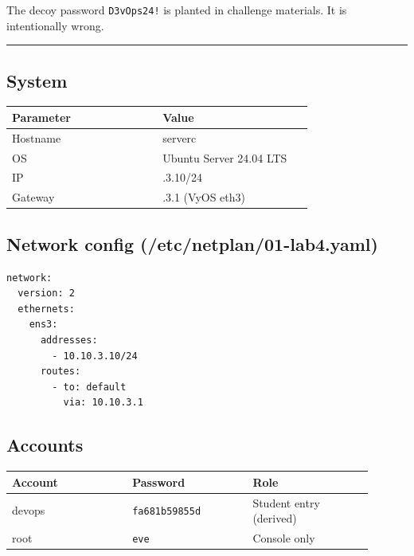 The decoy password \texttt{D3vOps24!} is planted in challenge materials. It is intentionally wrong.

\begin{center}\rule{0.5\linewidth}{0.5pt}\end{center}

\subsection{System}

{\footnotesize\begin{longtable}[]{@{}>{\raggedright\arraybackslash}p{0.45\linewidth}
  >{\raggedright\arraybackslash}p{0.45\linewidth}@{}}
\toprule\noalign{}
Parameter & Value \\
\midrule\noalign{}
\endhead
\bottomrule\noalign{}
\endlastfoot
Hostname & serverc \\
OS & Ubuntu Server 24.04 LTS \\
IP & 10.10.3.10/24 \\
Gateway & 10.10.3.1 (VyOS eth3) \\
\end{longtable}}

\subsection{\texorpdfstring{Network config ({\ttfamily /etc/netplan/01-lab4.yaml})}{Network config (/etc/netplan/01-lab4.yaml)}}

\begin{lstlisting}
network:
  version: 2
  ethernets:
    ens3:
      addresses:
        - 10.10.3.10/24
      routes:
        - to: default
          via: 10.10.3.1
\end{lstlisting}

\subsection{Accounts}

{\footnotesize\begin{longtable}[]{@{}>{\raggedright\arraybackslash}p{0.30\linewidth}
  >{\raggedright\arraybackslash}p{0.30\linewidth}
  >{\raggedright\arraybackslash}p{0.30\linewidth}@{}}
\toprule\noalign{}
Account & Password & Role \\
\midrule\noalign{}
\endhead
\bottomrule\noalign{}
\endlastfoot
devops & \texttt{fa681b59855d} & Student entry (derived) \\
root & \texttt{eve} & Console only \\
\end{longtable}}

